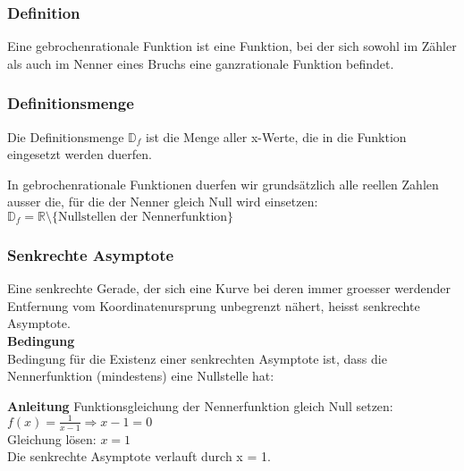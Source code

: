 \begin{multicols}{2}
    \subsubsection{Definition}
    \vspace{-4mm}
    Eine gebrochenrationale Funktion ist eine Funktion, bei der sich sowohl im Zähler als auch im Nenner eines Bruchs eine ganzrationale Funktion befindet.
    \subsubsection{Definitionsmenge}
    Die Definitionsmenge $\mathbb{D}_f$ ist die Menge aller x-Werte, die in die Funktion eingesetzt werden duerfen.

    In gebrochenrationale Funktionen duerfen wir grundsätzlich alle reellen Zahlen   ausser die, für die der Nenner gleich Null wird  einsetzen: $\mathbb{D}_f = \mathbb{R}\setminus\{\text{Nullstellen der Nennerfunktion}\}$
    \subsubsection{Senkrechte Asymptote}
    \vspace{-4mm}
    Eine senkrechte Gerade, der sich eine Kurve bei deren immer groesser werdender Entfernung vom Koordinatenursprung unbegrenzt nähert, heisst senkrechte Asymptote.\\
    \textbf{Bedingung}\\
    Bedingung für die Existenz einer senkrechten Asymptote ist, dass die Nennerfunktion (mindestens) eine Nullstelle hat:

    \textbf{Anleitung}
    Funktionsgleichung der Nennerfunktion gleich Null setzen: \\
    $f(x) = \frac{1}{x-1} \Longrightarrow x - 1 = 0$  \\
    Gleichung lösen: $x = 1$ \\
    Die senkrechte Asymptote verlauft durch x = 1.


\end{multicols}
